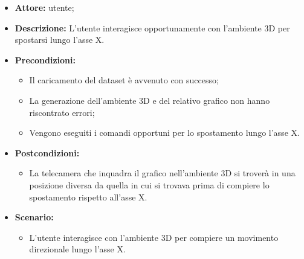 \begin{itemize}    
    \item \textbf{Attore:} utente;
    \item \textbf{Descrizione:} L'utente interagisce opportunamente con l'ambiente 3D per spostarsi lungo l'asse X.
    \item \textbf{Precondizioni:}    
        \begin{itemize}
            \item Il caricamento del dataset è avvenuto con successo;
            \item La generazione dell'ambiente 3D e del relativo grafico non hanno riscontrato errori;
            \item Vengono eseguiti i comandi opportuni per lo spostamento lungo l'asse X.
        \end{itemize}    
    \item \textbf{Postcondizioni:}
        \begin{itemize}
            \item La telecamera che inquadra il grafico nell'ambiente 3D si troverà in una posizione diversa da quella in cui si trovava prima di compiere lo spostamento rispetto all'asse X.
        \end{itemize}    
    \item \textbf{Scenario:} 
        \begin{itemize}
            \item L'utente interagisce con l'ambiente 3D per compiere un movimento direzionale lungo l'asse X.
        \end{itemize}
\end{itemize}
